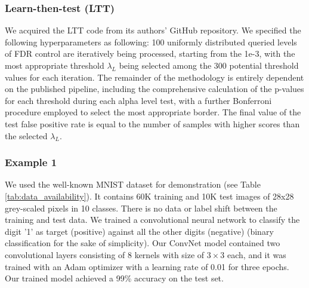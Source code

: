 \documentclass[10pt,letterpaper]{article}
\begin{document}
\subsubsection*{Learn-then-test (LTT)} We acquired the LTT code from its authors' GitHub repository.
We  specified the following hyperparameters as following: 100 uniformly distributed queried levels of FDR control are iteratively being processed, starting from the 1e-3, with the most appropriate threshold $\lambda_L$ being selected among the 300 potential threshold values for each iteration.
The remainder of the methodology is entirely dependent on the published pipeline, including the comprehensive calculation of the p-values for each threshold during each alpha level test, with a further Bonferroni procedure employed to select the most appropriate border.
The final value of the test false positive rate is equal to the number of samples with higher scores than the selected $\lambda_L$. 

\subsubsection*{Example 	 1} \label{ex:vanilla} We used the well-known MNIST dataset for demonstration \cite{lecun1998gradient} (see Table \ref{tab:data_availability}).
It contains 60K training and 10K test images of 28x28 grey-scaled pixels in 10 classes.
There is no data or label shift between the training and test data.
We trained a convolutional neural network to classify the digit '1' as target (positive) against all the other digits (negative) (binary classification for the sake of simplicity).
Our ConvNet model contained two convolutional layers consisting of 8 kernels with size of $3\times3$ each, and it was trained with an Adam optimizer with a learning rate of 0.01 for three epochs.
Our trained model achieved a 99\% accuracy on the test set. 
\end{document}
